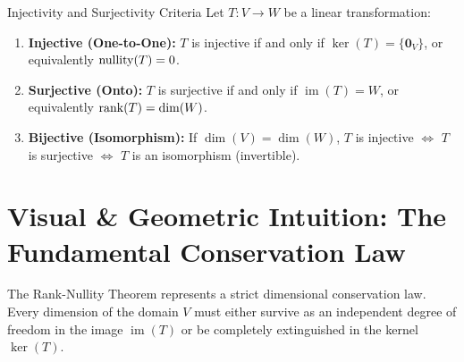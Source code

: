 \begin{theorembox}{Injectivity and Surjectivity Criteria}
Let $T: V \to W$ be a linear transformation:
\begin{enumerate}
    \item \textbf{Injective (One-to-One):} $T$ is injective if and only if $\ker(T) = \{\mathbf{0}_V\}$, or equivalently $\operatorname{nullity}(T) = 0$.
    \item \textbf{Surjective (Onto):} $T$ is surjective if and only if $\operatorname{im}(T) = W$, or equivalently $\operatorname{rank}(T) = \dim(W)$.
    \item \textbf{Bijective (Isomorphism):} If $\dim(V) = \dim(W)$, $T$ is injective $\iff$ $T$ is surjective $\iff$ $T$ is an isomorphism (invertible).
\end{enumerate}
\end{theorembox}

\section{Visual \& Geometric Intuition: The Fundamental Conservation Law}

The Rank-Nullity Theorem represents a strict dimensional conservation law. Every dimension of the domain $V$ must either survive as an independent degree of freedom in the image $\operatorname{im}(T)$ or be completely extinguished in the kernel $\ker(T)$.

